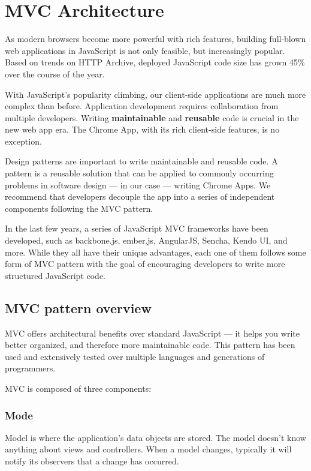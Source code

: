 
\chapter{MVC Architecture\cite{MVCArchitecture}}
As modern browsers become more powerful with rich features, building full-blown web applications in JavaScript is not only feasible, but increasingly popular. Based on trends on HTTP Archive, deployed JavaScript code size has grown 45\% over the course of the year.


With JavaScript's popularity climbing, our client-side applications are much more complex than before. Application development requires collaboration from multiple developers. Writing \textbf{maintainable} and \textbf{reusable} code is crucial in the new web app era. The Chrome App, with its rich client-side features, is no exception.

Design patterns are important to write maintainable and reusable code. A pattern is a reusable solution that can be applied to commonly occurring problems in software design — in our case — writing Chrome Apps. We recommend that developers decouple the app into a series of independent components following the MVC pattern.

In the last few years, a series of JavaScript MVC frameworks have been developed, such as backbone.js, ember.js, AngularJS, Sencha, Kendo UI, and more. While they all have their unique advantages, each one of them follows some form of MVC pattern with the goal of encouraging developers to write more structured JavaScript code.


\section{MVC pattern overview}
MVC offers architectural benefits over standard JavaScript — it helps you write better organized, and therefore more maintainable code. This pattern has been used and extensively tested over multiple languages and generations of programmers.

MVC is composed of three components:



\subsection{Mode}
Model is where the application's data objects are stored. The model doesn't know anything about views and controllers. When a model changes, typically it will notify its observers that a change has occurred.

